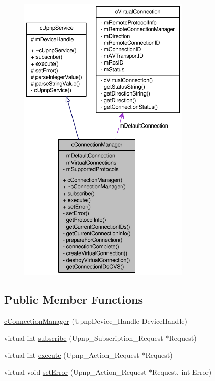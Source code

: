\begin{figure}[H]
\begin{center}
\leavevmode
\includegraphics[height=400pt]{classcConnectionManager__coll__graph}
\end{center}
\end{figure}
\subsection*{Public Member Functions}
\begin{CompactItemize}
\item 
\hyperlink{classcConnectionManager_2d6d4af3110c40c399a3e4e203283ff1}{cConnectionManager} (UpnpDevice\_\-Handle DeviceHandle)
\item 
virtual int \hyperlink{classcConnectionManager_7990eba09a100e5e4ee5b01b87bcc16e}{subscribe} (Upnp\_\-Subscription\_\-Request $\ast$Request)
\item 
virtual int \hyperlink{classcConnectionManager_12fa6b0a9e20c3af663e3ca2b3c97dfb}{execute} (Upnp\_\-Action\_\-Request $\ast$Request)
\item 
virtual void \hyperlink{classcConnectionManager_02014a637c6cb04cbfe10b3cb4ce6d1d}{setError} (Upnp\_\-Action\_\-Request $\ast$Request, int Error)
\end{CompactItemize}


